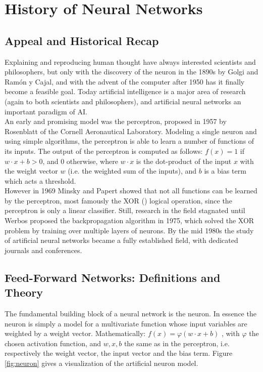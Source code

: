 \documentclass[12pt,oneside]{CUNY_CS_PhD}
\begin{document}
\tableofcontents

\mainmatter

\chapter{History of Neural Networks}
\section{Appeal and Historical Recap}
Explaining and reproducing human thought have always interested scientists and philosophers, but only with the discovery of the neuron in the 1890s by Golgi and Ram\'{o}n y Cajal, and with the advent of the computer after 1950 has it finally become a feasible goal. Today artificial intelligence is a major area of research (again to both scientists and philosophers), and artificial neural networks an important paradigm of AI.\\
An early and promising model was the perceptron, proposed in 1957 by Rosenblatt \cite{rosenblatt_perceptron_1957} of the Cornell Aeronautical Laboratory. Modeling a single neuron and using simple algorithms, the perceptron is able to learn a number of functions of its inputs. The output of the perceptron is computed as follows: $f(x) = 1$ if $w \cdot x + b>0$, and $0$ otherwise, where $w \cdot x$ is the dot-product of the input $x$ with the weight vector $w$ (i.e. the weighted sum of the inputs), and $b$ is a bias term which acts a threshold.\\
However in 1969 Minsky and Papert \cite{minsky_perceptrons_1969} showed that not all functions can be learned by the perceptron, most famously the XOR () logical operation, since the perceptron is only a linear classifier. Still, research in the field stagnated until Werbos proposed the backpropagation algorithm in 1975, which solved the XOR problem by training over multiple layers of neurons. By the mid 1980s the study of artificial neural networks became a fully established field, with dedicated journals and conferences.


\section{Feed-Forward Networks: Definitions and Theory}
The fundamental building block of a neural network is the neuron. In essence the neuron is simply a model for a multivariate function whose input variables are weighted by a weight vector. 
Mathematically: $f(x) = \varphi(w \cdot x +b)$ , with $\varphi$ the chosen activation function, and $w,x,b$ the same as in the perceptron, i.e. respectively the weight vector, the input vector and the bias term. Figure \ref{fig:neuron} gives a visualization of the artificial neuron model.\\
\end{document}
